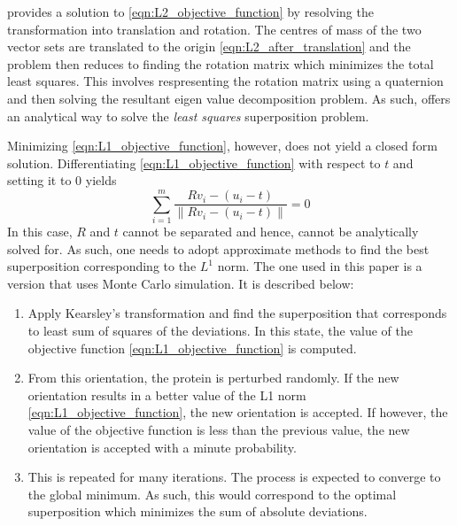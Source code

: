\documentclass[wcp]{jmlr}
\begin{document}
\citet{kearsley89} provides a solution to \eqref{eqn:L2_objective_function} by 
resolving the transformation into translation and rotation. The centres of mass of the
two vector sets are translated to the origin \eqref{eqn:L2_after_translation} and the problem then reduces to finding the
rotation matrix which minimizes the total least squares. This involves respresenting
the rotation matrix using a quaternion and then solving the resultant eigen value 
decomposition problem. As such, \citet{kearsley89} offers an analytical way to solve
the \emph{least squares} superposition problem. 
 
Minimizing \eqref{eqn:L1_objective_function}, however, does not yield a closed form solution. 
Differentiating \eqref{eqn:L1_objective_function} with respect to $t$ and setting it to $0$ yields
\begin{equation}
\sum_{i=1}^m \frac{Rv_i-(u_i-t)}{\|Rv_i-(u_i-t)\|} = 0 \label{eqn:L1_after_translation}
\end{equation} 
In this case, $R$ and $t$ cannot be separated and hence, cannot be analytically solved for.
As such, one needs to adopt approximate methods to find the best superposition corresponding
to the $L^1$ norm. The one used in this paper is a version that uses Monte Carlo simulation. 
It is described below:
\begin{enumerate}
\item Apply Kearsley's transformation and find the superposition that corresponds
to least sum of squares of the deviations. In this state, the value of the 
objective function \eqref{eqn:L1_objective_function} is computed. 
\item From this orientation, the protein is perturbed randomly. If the new orientation
results in a better value of the L1 norm \eqref{eqn:L1_objective_function}, the new orientation is
accepted. If however, the value of the objective function is less than the previous
value, the new orientation is accepted with a minute probability.
\item This is repeated for many iterations. The process is expected to converge to
the global minimum. As such, this would correspond to the optimal
superposition which minimizes the sum of absolute deviations.
\end{enumerate}
\end{document}
